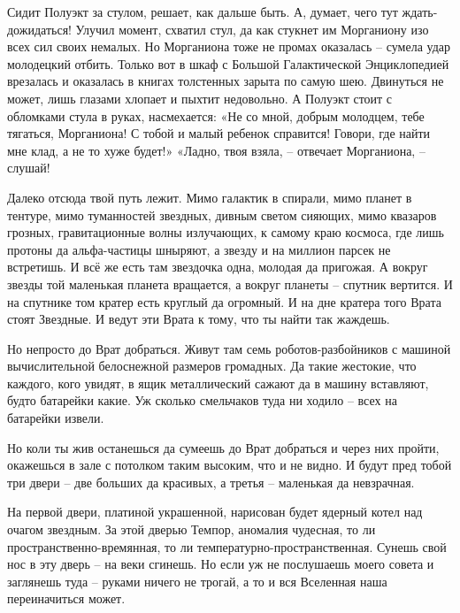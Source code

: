 \documentclass[ebook,oneside,final,openright]{memoir}
\begin{document}
Сидит Полуэкт за стулом, решает, как дальше быть. А, думает, чего тут ждать-дожидаться! Улучил момент, схватил стул, да как стукнет им Морганиону изо всех сил своих немалых. Но Морганиона тоже не промах оказалась – сумела удар молодецкий отбить. Только вот в шкаф с Большой Галактической Энциклопедией врезалась и оказалась в книгах толстенных зарыта по самую шею. Двинуться не может, лишь глазами хлопает и пыхтит недовольно. А Полуэкт стоит с обломками стула в руках, насмехается: «Не со мной, добрым молодцем, тебе тягаться, Морганиона! С тобой и малый ребенок справится! Говори, где найти мне клад, а не то хуже будет!» «Ладно, твоя взяла, – отвечает Морганиона, – слушай!\par
\par
Далеко отсюда твой путь лежит. Мимо галактик в спирали, мимо планет в тентуре, мимо туманностей звездных, дивным светом сияющих, мимо квазаров грозных, гравитационные волны излучающих, к самому краю космоса, где лишь протоны да альфа-частицы шныряют, а звезду и на миллион парсек не встретишь. И всё же есть там звездочка одна, молодая да пригожая. А вокруг звезды той маленькая планета вращается, а вокруг планеты – спутник вертится. И на спутнике том кратер есть круглый да огромный. И на дне кратера того Врата стоят Звездные. И ведут эти Врата к тому, что ты найти так жаждешь.\par
\par
Но непросто до Врат добраться. Живут там семь роботов-разбойников с машиной вычислительной белоснежной размеров громадных. Да такие жестокие, что каждого, кого увидят, в ящик металлический сажают да в машину вставляют, будто батарейки какие. Уж сколько смельчаков туда ни ходило – всех на батарейки извели.\par
\par
Но коли ты жив останешься да сумеешь до Врат добраться и через них пройти, окажешься в зале с потолком таким высоким, что и не видно. И будут пред тобой три двери – две больших да красивых, а третья – маленькая да невзрачная.\par
\par
На первой двери, платиной украшенной, нарисован будет ядерный котел над очагом звездным. За этой дверью Темпор, аномалия чудесная, то ли пространственно-времянная, то ли температурно-пространственная. Сунешь свой нос в эту дверь – на веки сгинешь. Но если уж не послушаешь моего совета и заглянешь туда – руками ничего не трогай, а то и вся Вселенная наша переиначиться может.\par
\par
\end{document}

